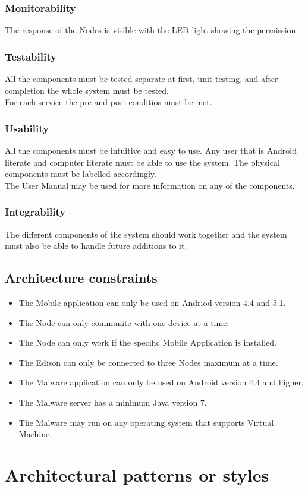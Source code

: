 \documentclass[a4paper,12pt,titlepage]{article}
\begin{document}
\subsubsection{Monitorability}
The response of the Nodes is visible with the LED light showing the permission.

\subsubsection{Testability}
All the components must be tested separate at first, unit testing, and after completion the whole system must be tested.
\\ For each service the pre and post conditios must be met.

\subsubsection{Usability}
All the components must be intuitive and easy to use. Any user that is Android literate and computer literate must be able to use the system. The physical components must be labelled accordingly. 
\\ The User Manual may be used for more information on any of the components. 

\subsubsection{Integrability}
The different components of the system should work together and the system must also be able to handle future additions to it.\\

\subsection{Architecture constraints}
	\begin{itemize}
		\item The Mobile application can only be used on Andriod version 4.4 and 5.1.
		\item The Node can only communite with one device at a time.
		\item The Node can only work if the specific Mobile Application is installed.
		\item The Edison  can only be connected to three Nodes maximum at a time.
		\item The Malware application can only be used on Android version 4.4 and higher.
		\item The Malware server has a minimum Java version 7.
		\item The Malware may run on any operating system that supports Virtual Machine.

	\end{itemize}
\newpage	\section{Architectural patterns or styles}
\end{document}
